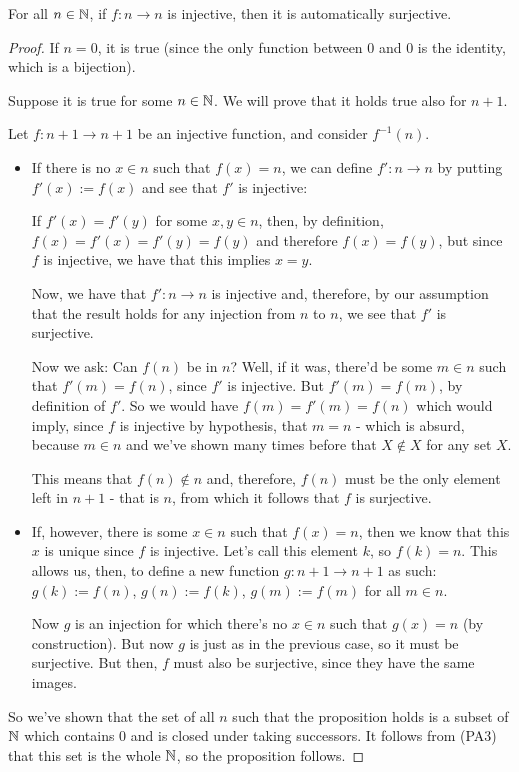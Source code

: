 \begin{prop}
	For all $n\in\mathbb N$, if $f:n\to n$ is injective, then it is automatically surjective.
\end{prop}
\begin{proof}
	If $n=0$, it is true (since the only function between 0 and 0 is the identity, which is a bijection).
	
	Suppose it is true for some $n\in \mathbb N$. We will prove that it holds true also for $n+1$.
	
	Let $f:n+1\to n+1$ be an injective function, and consider $f^{-1}(n)$.
	\begin{itemize}
		\item If there is no $x\in n$ such that $f(x)=n$, we can define $f':n\to n$ by putting $f'(x):=f(x)$ and see that $f'$ is injective:
		
		If $f'(x)=f'(y)$ for some $x,y\in n$, then, by definition, $f(x)=f'(x)=f'(y)=f(y)$ and therefore $f(x)=f(y)$, but since $f$ is injective, we have that this implies $x=y$.
		
		Now, we have that $f':n\to n$ is injective and, therefore, by our assumption that the result holds for any injection from $n$ to $n$, we see that $f'$ is surjective.
		
		Now we ask: Can $f(n)$ be in $n$? Well, if it was, there'd be some $m\in n$ such that $f'(m)=f(n)$, since $f'$ is injective. But $f'(m)=f(m)$, by definition of $f'$. So we would have $f(m)=f'(m)=f(n)$ which would imply, since $f$ is injective by hypothesis, that $m=n$ - which is absurd, because $m\in n$ and we've shown many times before that $X\notin X$ for any set $X$.
		
		This means that $f(n)\notin n$ and, therefore, $f(n)$ must be the only element left in $n+1$ - that is $n$, from which it follows that $f$ is surjective.
		
		\item If, however, there is some $x\in n$ such that $f(x)=n$, then we know that this $x$ is unique since $f$ is injective. Let's call this element $k$, so $f(k)=n$. This allows us, then, to define a new function $g:n+1\to n+1$ as such: $g(k):=f(n)$, $g(n):=f(k)$, $g(m):=f(m)$ for all $m\in n$.
		
		Now $g$ is an injection for which there's no $x\in n$ such that $g(x)=n$ (by construction). But now $g$ is just as in the previous case, so it must be surjective. But then, $f$ must also be surjective, since they have the same images.
	\end{itemize}

So we've shown that the set of all $n$ such that the proposition holds is a subset of $\mathbb N$ which contains 0 and is closed under taking successors. It follows from (PA3) that this set is the whole $\mathbb N$, so the proposition follows.
\end{proof}
